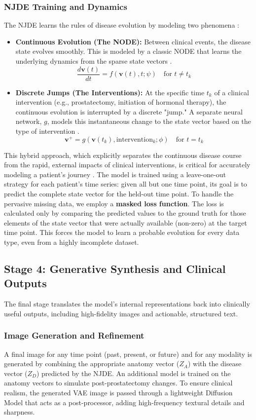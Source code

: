 \documentclass[11pt, a4paper]{article}
\begin{document}
\subsubsection{NJDE Training and Dynamics}
The NJDE learns the rules of disease evolution by modeling two phenomena \cite{GwakSim2020}:
\begin{itemize}
    \item \textbf{Continuous Evolution (The NODE):} Between clinical events, the disease state evolves smoothly. This is modeled by a classic NODE that learns the underlying dynamics from the sparse state vectors \cite{BergHasenclever2018}.
    $$ \frac{d\mathbf{v}(t)}{dt} = f(\mathbf{v}(t), t; \psi) \quad \text{for } t \neq t_k $$
    \item \textbf{Discrete Jumps (The Interventions):} At the specific time $t_k$ of a clinical intervention (e.g., prostatectomy, initiation of hormonal therapy), the continuous evolution is interrupted by a discrete "jump." A separate neural network, $g$, models this instantaneous change to the state vector based on the type of intervention \cite{CuchieroLarsson2019, AbushaqraXue2022}.
    $$ \mathbf{v}^+ = g(\mathbf{v}(t_k), \text{intervention}_k; \phi) \quad \text{for } t = t_k $$
\end{itemize}
This hybrid approach, which explicitly separates the continuous disease course from the rapid, external impacts of clinical interventions, is critical for accurately modeling a patient's journey \cite{GwakSim2020}. The model is trained using a leave-one-out strategy for each patient's time series: given all but one time point, its goal is to predict the complete state vector for the held-out time point. To handle the pervasive missing data, we employ a \textbf{masked loss function}. The loss is calculated only by comparing the predicted values to the ground truth for those elements of the state vector that were actually available (non-zero) at the target time point. This forces the model to learn a probable evolution for every data type, even from a highly incomplete dataset.

\subsection{Stage 4: Generative Synthesis and Clinical Outputs}
The final stage translates the model's internal representations back into clinically useful outputs, including high-fidelity images and actionable, structured text.

\subsubsection{Image Generation and Refinement}
A final image for any time point (past, present, or future) and for any modality is generated by combining the appropriate anatomy vector ($Z_A$) with the disease vector ($Z_D$) predicted by the NJDE. An additional model is trained on the anatomy vectors to simulate post-prostatectomy changes. To ensure clinical realism, the generated VAE image is passed through a lightweight Diffusion Model that acts as a post-processor, adding high-frequency textural details and sharpness.
\end{document}
